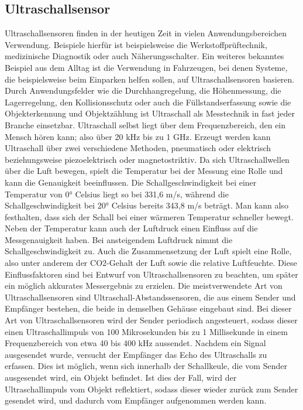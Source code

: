 \subsection{Ultraschallsensor}
Ultraschallsensoren finden in der heutigen Zeit in vielen Anwendungsbereichen Verwendung. Beispiele hierfür ist beispielsweise die Werkstoffprüftechnik, medizinische Diagnostik oder auch Näherungsschalter. Ein weiteres bekanntes Beispiel aus dem Alltag ist die Verwendung in Fahrzeugen, bei denen Systeme, die beispielsweise beim Einparken helfen sollen, auf Ultraschallsensoren basieren. Durch Anwendungsfelder wie die Durchhangregelung, die Höhenmessung, die Lagerregelung, den Kollisionsschutz oder auch die Füllstandserfassung sowie die Objekterkennung und Objektzählung ist Ultraschall als Messtechnik in fast jeder Branche einsetzbar.\autocite[Vgl.][S. 182]{ultraschall2}
Ultraschall selbst liegt über dem Frequenzbereich, den ein Mensch hören kann; also über 20 kHz bis zu 1 GHz.\autocite[Vgl.][S. 177]{ultraschall2} Erzeugt werden kann Ultraschall über zwei verschiedene Methoden, pneumatisch oder elektrisch beziehungsweise piezoelektrisch oder magnetostriktiv.\autocite[Vgl.][S. 70]{sensoren} Da sich Ultraschallwellen über die Luft bewegen, spielt die Temperatur bei der Messung eine Rolle und kann die Genauigkeit beeinflussen. Die Schallgeschwindigkeit bei einer Temperatur von 0° Celsius liegt so  bei 331,6 m/s, während die Schallgeschwindigkeit bei 20° Celsius bereits 343,8 m/s beträgt. Man kann also festhalten, dass sich der Schall bei einer wärmeren Temperatur schneller bewegt. 
Neben der Temperatur kann auch der Luftdruck einen Einfluss auf die Messgenauigkeit haben. Bei ansteigendem Luftdruck nimmt die Schallgeschwindigkeit zu. Auch die Zusammensetzung der Luft spielt eine Rolle, also unter anderem der CO2-Gehalt der Luft sowie die relative Luftfeuchte. Diese Einflussfaktoren sind bei Entwurf von Ultraschallsensoren zu beachten, um später ein möglich akkurates Messergebnis zu erzielen.\autocite[Vgl.][S. 71]{sensoren}
Die meistverwendete Art von Ultraschallsensoren sind Ultraschall-Abstandssensoren, die aus einem Sender und Empfänger bestehen, die beide in demselben Gehäuse eingebaut sind. Bei dieser Art von Ultraschallsensoren wird der Sender periodisch angesteuert, sodass dieser einen Ultraschallimpuls von 100 Mikrosekunden bis zu 1 Millisekunde in einem Frequenzbereich von etwa 40 bis 400 kHz aussendet. Nachdem ein Signal ausgesendet wurde, versucht der Empfänger das Echo des Ultraschalls zu erfassen. Dies ist möglich, wenn sich innerhalb der Schallkeule, die vom Sender ausgesendet wird, ein Objekt befindet. Ist dies der Fall, wird der Ultraschallimpuls vom Objekt reflektiert, sodass dieser wieder zurück zum Sender gesendet wird, und dadurch vom Empfänger aufgenommen werden kann.

